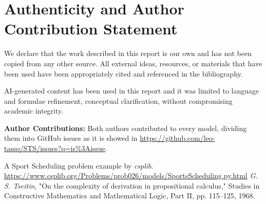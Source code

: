 \documentclass[11pt]{article}
\begin{document}
\newpage
\section*{Authenticity and Author Contribution Statement}

We declare that the work described in this report is our own and has not been copied from any other source. All external ideas, resources, or materials that have been used have been appropriately cited and referenced in the bibliography.

AI-generated content has been used in this report and it was limited to language and formulae refinement, conceptual clarification, without compromising academic integrity.

\noindent \textbf{Author Contributions:}
Both authors contributed to every model, dividing them into GitHub issues as it is showed in \url{https://github.com/leo-tasso/STS/issues?q=is%3Aissue}.



\begin{thebibliography}{99}

A Sport Scheduling problem example by \textit{csplib}.\\
\url{https://www.csplib.org/Problems/prob026/models/SportsScheduling.py.html}
\textit{G. S. Tseitin}, "On the complexity of derivation in propositional calculus," Studies in Constructive Mathematics and Mathematical Logic, Part II, pp. 115–125, 1968.

\end{thebibliography}
\end{document}
